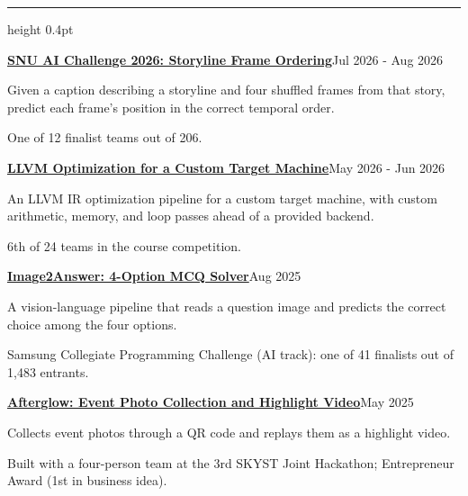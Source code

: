 \documentclass[letterpaper,10pt]{article}
\newcommand{\heading}[1]{%
  \par\vspace{6.5pt}%
  {\Large\bfseries\rule{0pt}{10pt}\smash{#1}}\par
  \vspace{4.5pt}%
  \hrule height 0.4pt
  \vspace{5pt}%
}
\newenvironment{resbody}%
  {\begin{list}{}{%
     \setlength{\leftmargin}{0.175in}%
     \setlength{\rightmargin}{0pt}%
     \setlength{\topsep}{2pt}%
     \setlength{\parsep}{0pt}%
     \setlength{\itemsep}{0pt}%
   }\item[]}%
  {\par\strut\vspace{-\baselineskip}\end{list}}
\newcommand{\rline}[2]{{\setlength{\parfillskip}{0pt}\strut #1\hfill #2\par}}
\newcommand{\entry}[2]{\rline{\textbf{#1}}{#2}}
\newcommand{\entrygap}{\vspace{3pt}}
\begin{document}

\heading{Projects}
\begin{resbody}
  \entry{\href{https://github.com/Birmjune/SNU_AI_Challenge_2026_DeepRed}{SNU AI Challenge 2026: Storyline Frame Ordering}}{Jul 2026 - Aug 2026}
  \begin{points}
    \item Given a caption describing a storyline and four shuffled frames from that story,
      predict each frame's position in the correct temporal order.
    \item One of 12 finalist teams out of 206.
  \end{points}

  \entrygap
  \entry{\href{https://github.com/Birmjune/swpp202601-team15}{LLVM Optimization for a Custom Target Machine}}{May 2026 - Jun 2026}
  \begin{points}
    \item An LLVM IR optimization pipeline for a custom target machine, with custom arithmetic,
      memory, and loop passes ahead of a provided backend.
    \item 6th of 24 teams in the course competition.
  \end{points}
  \entrygap
  \entry{\href{https://github.com/Birmjune/Image2Answer-4optionMCQ}{Image2Answer: 4-Option MCQ Solver}}{Aug 2025}
  \begin{points}
    \item A vision-language pipeline that reads a question image and predicts the correct
      choice among the four options.
    \item Samsung Collegiate Programming Challenge (AI track): one of 41 finalists out of
      1,483 entrants.
  \end{points}

  \entrygap
  \entry{\href{https://github.com/CSEneversleep/cns-next}{Afterglow: Event Photo Collection and Highlight Video}}{May 2025}
  \begin{points}
    \item Collects event photos through a QR code and replays them as a highlight video.
    \item Built with a four-person team at the 3rd SKYST Joint Hackathon;
      Entrepreneur Award (1st in business idea).
  \end{points}


\end{resbody}
\end{document}
